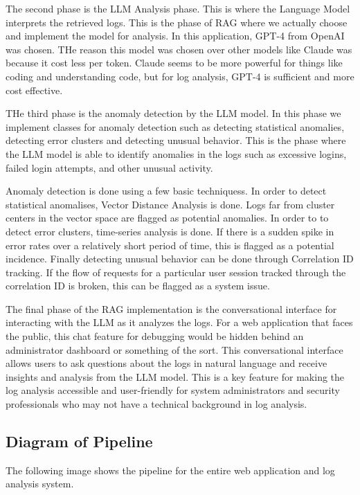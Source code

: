 \documentclass[sigconf]{acmart}
\begin{document}
The second phase is the LLM Analysis phase. This is where the Language Model interprets the retrieved logs. This is the phase of RAG where we actually choose and implement the model for analysis. In this application, GPT-4 from OpenAI was chosen. THe reason this model was chosen over other models like Claude was because it cost less per token. Claude seems to be more powerful for things like coding and understanding code, but for log analysis, GPT-4 is sufficient and more cost effective.

THe third phase is the anomaly detection by the LLM model. In this phase we implement classes for anomaly detection such as detecting statistical anomalies, detecting error clusters and detecting unusual behavior. This is the phase where the LLM model is able to identify anomalies in the logs such as excessive logins, failed login attempts, and other unusual activity.

Anomaly detection is done using a few basic techniquess. In order to detect statistical anomalises, Vector Distance Analysis is done. Logs far from cluster centers in the vector space are flagged as potential anomalies. In order to to detect error clusters, time-series analysis is done. If there is a sudden spike in error rates over a relatively short period of time, this is flagged as a potential incidence. Finally detecting unusual behavior can be done through Correlation ID tracking. If the flow of requests for a particular user session tracked through the correlation ID is broken, this can be flagged as a system issue.

The final phase of the RAG implementation is the conversational interface for interacting with the LLM as it analyzes the logs. For a web application that faces the public, this chat feature for debugging would be hidden behind an administrator dashboard or something of the sort. This conversational interface allows users to ask questions about the logs in natural language and receive insights and analysis from the LLM model. This is a key feature for making the log analysis accessible and user-friendly for system administrators and security professionals who may not have a technical background in log analysis.

\subsection{Diagram of Pipeline}

The following image shows the pipeline for the entire web application and log analysis system.
\end{document}
